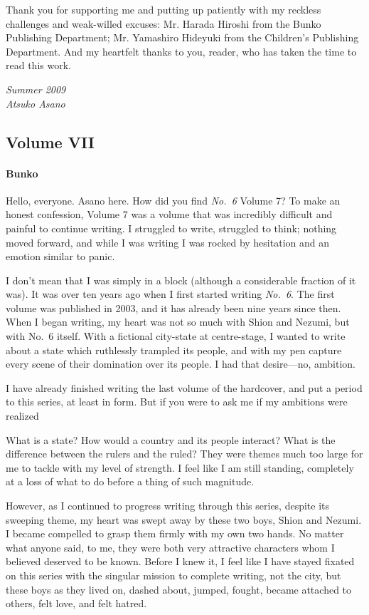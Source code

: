 Thank you for supporting me and putting up patiently with my reckless
challenges and weak-willed excuses: Mr. Harada Hiroshi from the Bunko
Publishing Department; Mr. Yamashiro Hideyuki from the Children's
Publishing Department. And my heartfelt thanks to you, reader, who has
taken the time to read this work.

\myspace

\emph{Summer 2009\\
	Atsuko Asano}

\clearpage
\subsection{Volume VII}
\paragraph{Bunko}

Hello, everyone. Asano here. How did you find \emph{No.~6} Volume 7? To make an honest confession, Volume 7 was a volume that was incredibly difficult and painful to continue writing. I struggled to write, struggled to think; nothing moved forward, and while I was writing I was rocked by hesitation and an emotion similar to panic.

I don't mean that I was simply in a block (although a considerable fraction of it was). It was over ten years ago when I first started writing \emph{No.~6}. The first volume was published in 2003, and it has already been nine years since then. When I began writing, my heart was not so much with Shion and Nezumi, but with No.~6 itself. With a fictional city-state at centre-stage, I wanted to write about a state which ruthlessly trampled its people, and with my pen capture every scene of their domination over its people. I had that desire---no, ambition.

I have already finished writing the last volume of the hardcover, and put a period to this series, at least in form. But if you were to ask me if my ambitions were realized\el 

What is a state? How would a country and its people interact? What is the difference between the rulers and the ruled? They were themes much too large for me to tackle with my level of strength. I feel like I am still standing, completely at a loss of what to do before a thing of such magnitude.

However, as I continued to progress writing through this series, despite its sweeping theme, my heart was swept away by these two boys, Shion and Nezumi. I became compelled to grasp them firmly with my own two hands. No matter what anyone said, to me, they were both very attractive characters whom I believed deserved to be known. Before I knew it, I feel like I have stayed fixated on this series with the singular mission to complete writing, not the city, but these boys as they lived on, dashed about, jumped, fought, became attached to others, felt love, and felt hatred.

